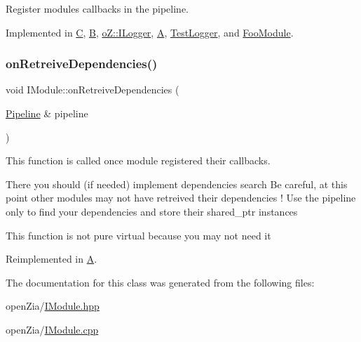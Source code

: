 Register module\textquotesingle{}s callbacks in the pipeline. 



Implemented in \mbox{\hyperlink{class_c_ae55c5d0571aadf7e48cae4d1e4fcf591}{C}}, \mbox{\hyperlink{class_b_a681f13a5b7d401fe80a18b63f90b0f89}{B}}, \mbox{\hyperlink{classo_z_1_1_i_logger_a10732b6da6e8f085c6fe5fa154d361ef}{o\+Z\+::\+I\+Logger}}, \mbox{\hyperlink{class_a_ac82f8db798576ee2eff8b6b91b77c239}{A}}, \mbox{\hyperlink{class_test_logger_a0ee94278a66b189ca55f04e40192b5d1}{Test\+Logger}}, and \mbox{\hyperlink{class_foo_module_a34a4cc51ff4c493a981d61e9d9eeeb1a}{Foo\+Module}}.

\mbox{\label{classo_z_1_1_i_module_af183d3711ef7d7a6966ac078b63a7685}} 
\subsubsection{\texorpdfstring{onRetreiveDependencies()}{onRetreiveDependencies()}}
{\footnotesize\ttfamily void I\+Module\+::on\+Retreive\+Dependencies (\begin{DoxyParamCaption}\item[{\mbox{\hyperlink{classo_z_1_1_pipeline}{Pipeline}} \&}]{pipeline }\end{DoxyParamCaption})\hspace{0.3cm}{\ttfamily [virtual]}}



This function is called once module registered their callbacks. 

There you should (if needed) implement dependencies search Be careful, at this point other modules may not have retreived their dependencies ! Use the pipeline only to find your dependencies and store their shared\+\_\+ptr instances

This function is not pure virtual because you may not need it 

Reimplemented in \mbox{\hyperlink{class_a_a968473c1dcccfee5502df74229fb263b}{A}}.



The documentation for this class was generated from the following files\+:\begin{DoxyCompactItemize}
\item 
open\+Zia/\mbox{\hyperlink{_i_module_8hpp}{I\+Module.\+hpp}}\item 
open\+Zia/\mbox{\hyperlink{_i_module_8cpp}{I\+Module.\+cpp}}\end{DoxyCompactItemize}
